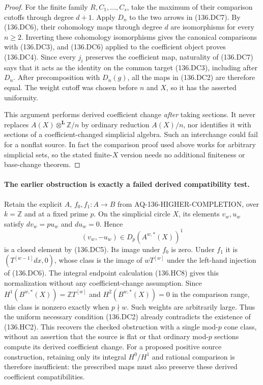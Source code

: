 \begin{proof}
For the finite family $R,C_1,\ldots,C_s$, take the maximum
of their comparison cutoffs through degree $d+1$.
Apply $D_n$ to the two arrows in (136.DC7).
By (136.DC6), their cohomology maps through degree $d$
are isomorphisms for every $n\ge2$.  Inverting these
cohomology isomorphisms gives the canonical comparisons
with (136.DC3), and (136.DC6) applied to the coefficient
object proves (136.DC4).
Since every $j_i$ preserves the coefficient map, naturality
of (136.DC7) says that it acts as the identity on the
common target (136.DC3), including after $D_n$.
After precomposition with $D_n(g)$, all the maps in
(136.DC2) are therefore equal.  The weight cutoff was
chosen before $n$ and $X$, so it has the asserted uniformity.

This argument performs derived coefficient change
\emph{after} taking sections.  It never replaces
$A(X)\otimes^{\mathbf L}\mathbb Z/n$ by ordinary reduction
$A(X)/n$, nor identifies it with sections of a
coefficient-changed simplicial algebra.  Such an
interchange could fail for a nonflat source.  In fact
the comparison proof used above works for arbitrary
simplicial sets, so the stated finite-$X$ version needs
no additional finiteness or base-change theorem.
\end{proof}

\paragraph{The earlier obstruction is exactly a failed derived compatibility test.}
Retain the explicit $A$, $f_0,f_1:A\to B$ from
AQ-136-HIGHER-COMPLETION, over $k=\mathbb Z$ and at a
fixed prime $p$.  On the simplicial circle $X$, its
elements $v_w,u_w$ satisfy
$dv_w=p u_w$ and $du_w=0$.  Hence
\[
                 (v_w,-u_w)\in D_p(A^{w,*}(X))^1
                                                               \tag{136.DC8}
\]
is a closed element by (136.DC5).  Its image under $f_0$
is zero.  Under $f_1$ it is
$(T^{[w-1]}dx,0)$, whose class is the image of
$wT^{[w]}$ under the left-hand injection of (136.DC6).
The integral endpoint calculation (136.HC8) gives this
normalization without any coefficient-change assumption.
Since $H^1(B^{w,*}(X))=\mathbb ZT^{[w]}$ and
$H^2(B^{w,*}(X))=0$ in the comparison range, this class
is nonzero exactly when $p\nmid w$.
Such weights are arbitrarily large.  Thus the uniform
necessary condition (136.DC2) already contradicts the
existence of (136.HC2).  This recovers the checked
obstruction with a single mod-$p$ cone class, without
an assertion that the source is flat or that ordinary
mod-$p$ sections compute its derived coefficient change.
For a proposed positive source construction, retaining
only its integral $H^0/H^1$ and rational comparison is
therefore insufficient: the prescribed maps must also
preserve these derived coefficient compatibilities.
